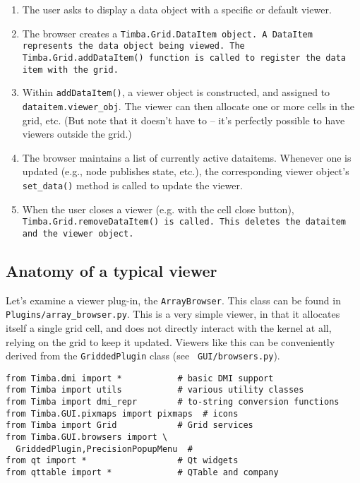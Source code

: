 \documentclass[12pt,twoside]{book}
\begin{document}
  \begin{enumerate} \item The user asks to display a data object with a specific
  or default viewer.

  \item The browser creates a \tt{Timba.Grid.DataItem} object. A \tt{DataItem} 
  represents the data object being viewed. The \tt{Timba.Grid.addDataItem()} 
  function is called to register the data item with the grid.
  
  \item Within {\tt addDataItem()}, a viewer object is constructed, and assigned
  to {\tt dataitem.viewer_obj}. The viewer can then allocate one or more cells
  in the grid, etc. (But note that it doesn't have to -- it's perfectly possible
  to have viewers outside the grid.)

  \item The browser maintains a list of currently active dataitems. Whenever one
  is updated (e.g., node publishes state, etc.), the corresponding viewer
  object's {\tt set\_data()} method is called to update the viewer.
  
  \item When the user closes a viewer (e.g. with the cell close button),
  \tt{Timba.Grid.removeDataItem()} is called. This deletes the dataitem and the
  viewer object.

  \end{enumerate}
  
\subsection{Anatomy of a typical viewer}

  Let's examine a viewer plug-in, the {\tt ArrayBrowser}. This class can be
  found in {\tt Plugins/array\_browser.py}. This is a very simple viewer, in that
  it allocates itself a single grid cell, and does not directly interact with
  the kernel at all, relying on the grid to keep it updated. Viewers like this
  can be conveniently derived from the {\tt GriddedPlugin} class (see {\tt
  GUI/browsers.py}). 

\begin{verbatim}  
from Timba.dmi import *           # basic DMI support
from Timba import utils           # various utility classes
from Timba import dmi_repr        # to-string conversion functions
from Timba.GUI.pixmaps import pixmaps  # icons
from Timba import Grid            # Grid services
from Timba.GUI.browsers import \
  GriddedPlugin,PrecisionPopupMenu  # 
from qt import *                  # Qt widgets
from qttable import *             # QTable and company
\end{verbatim}
\end{document}
